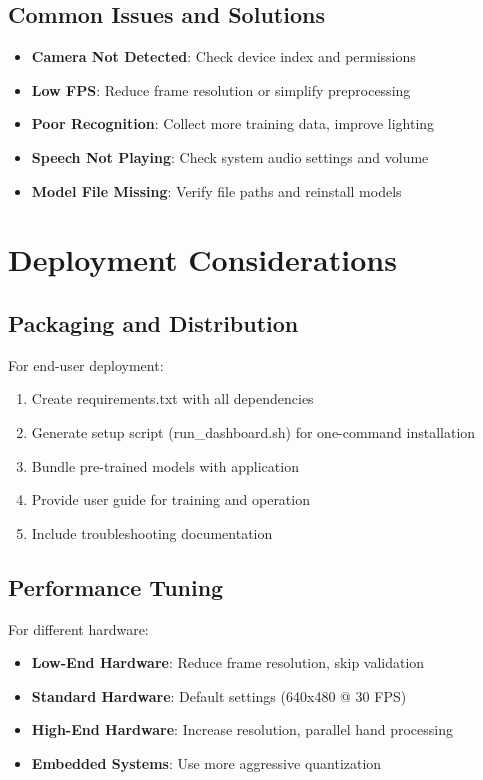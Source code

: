 \subsection{Common Issues and Solutions}

\begin{itemize}
    \item \textbf{Camera Not Detected}: Check device index and permissions
    \item \textbf{Low FPS}: Reduce frame resolution or simplify preprocessing
    \item \textbf{Poor Recognition}: Collect more training data, improve lighting
    \item \textbf{Speech Not Playing}: Check system audio settings and volume
    \item \textbf{Model File Missing}: Verify file paths and reinstall models
\end{itemize}

\section{Deployment Considerations}

\subsection{Packaging and Distribution}

For end-user deployment:
\begin{enumerate}
    \item Create requirements.txt with all dependencies
    \item Generate setup script (run\_dashboard.sh) for one-command installation
    \item Bundle pre-trained models with application
    \item Provide user guide for training and operation
    \item Include troubleshooting documentation
\end{enumerate}

\subsection{Performance Tuning}

For different hardware:
\begin{itemize}
    \item \textbf{Low-End Hardware}: Reduce frame resolution, skip validation
    \item \textbf{Standard Hardware}: Default settings (640x480 @ 30 FPS)
    \item \textbf{High-End Hardware}: Increase resolution, parallel hand processing
    \item \textbf{Embedded Systems}: Use more aggressive quantization
\end{itemize}

